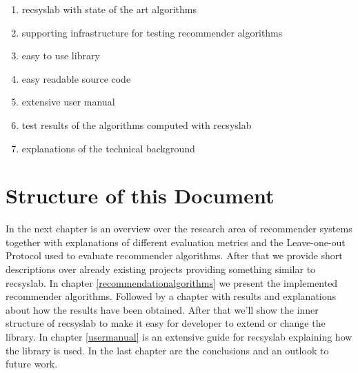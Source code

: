 \begin{enumerate}
    \item recsyslab with state of the art algorithms
    \item supporting infrastructure for testing recommender algorithms
    \item easy to use library
    \item easy readable source code
    \item extensive user manual
    \item test results of the algorithms computed with recsyslab
    \item explanations of the technical background
\end{enumerate}


\section{Structure of this Document}
In the next chapter is an overview over the research area of recommender systems
together with explanations of different evaluation metrics and the Leave-one-out
Protocol used to evaluate recommender algorithms.
After that we provide short descriptions over already existing 
projects providing something similar to recsyslab.
In chapter \ref{recommendationalgorithms} we present the implemented recommender
algorithms. Followed by a chapter with results and explanations about how the
results have been obtained. After that we'll show the inner structure of recsyslab
to make it easy for developer to extend or change the library.
In chapter \ref{usermanual} is an extensive guide for recsyslab explaining
how the library is used.
In the last chapter are the conclusions and an outlook to future work.



